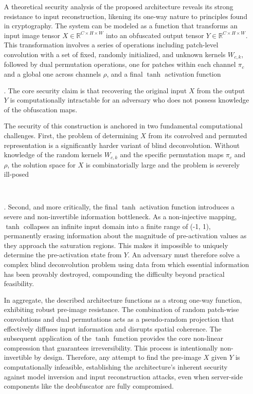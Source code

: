 \documentclass{ieeeaccess}
\begin{document}
{A theoretical security analysis of the proposed architecture reveals its strong resistance to input reconstruction, likening its one-way nature to principles found in cryptography. The system can be modeled as a function that transforms an input image tensor $X \in \mathbb{R}^{C \times H \times W}$ into an obfuscated output tensor $Y \in \mathbb{R}^{C \times H \times W}$. This transformation involves a series of operations including patch-level convolution with a set of fixed, randomly initialized, and unknown kernels $W_{c,k}$, followed by dual permutation operations, one for patches within each channel $\pi_c$ and a global one across channels $\rho$, and a final $\tanh$ activation function}~\cite{46614}{. The core security claim is that recovering the original input $X$ from the output $Y$ is computationally intractable for an adversary who does not possess knowledge of the obfuscation maps.

The security of this construction is anchored in two fundamental computational challenges. First, the problem of determining $X$ from its convolved and permuted representation is a significantly harder variant of blind deconvolution. Without knowledge of the random kernels $W_{c,k}$ and the specific permutation maps $\pi_c$ and $\rho$, the solution space for $X$ is combinatorially large and the problem is severely ill-posed}~\cite{10.1007/978-3-030-33843-5_16}{. Second, and more critically, the final $\tanh$ activation function introduces a severe and non-invertible information bottleneck. As a non-injective mapping, $\tanh$ collapses an infinite input domain into a finite range of (-1, 1), permanently erasing information about the magnitude of pre-activation values as they approach the saturation regions. This makes it impossible to uniquely determine the pre-activation state from $Y$. An adversary must therefore solve a complex blind deconvolution problem using data from which essential information has been provably destroyed, compounding the difficulty beyond practical feasibility.

In aggregate, the described architecture functions as a strong one-way function, exhibiting robust pre-image resistance. The combination of random patch-wise convolutions and dual permutations acts as a pseudo-random projection that effectively diffuses input information and disrupts spatial coherence. The subsequent application of the $\tanh$ function provides the core non-linear compression that guarantees irreversibility. This process is intentionally non-invertible by design. Therefore, any attempt to find the pre-image $X$ given $Y$ is computationally infeasible, establishing the architecture's inherent security against model inversion and input reconstruction attacks, even when server-side components like the deobfuscator are fully compromised.}
\end{document}
